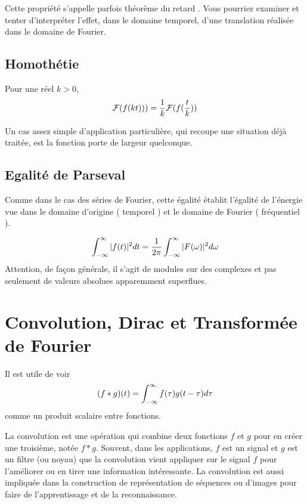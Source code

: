 Cette propriété s'appelle parfois { théorème du retard }.  Vous
pourriez examiner et tenter d'interpréter l'effet, dans le domaine
temporel, d'une translation réalisée dans le domaine de Fourier.

\subsection{Homothétie}
Pour une réel $k>0$,
\begin{equation}
 {\cal F}(f(kt)))=\frac{1}{k}{\cal F}(f(\frac{t}{k}))
\end{equation}

Un cas assez simple d'application particulière, qui recoupe une situation déjà traitée, est la fonction porte de largeur quelconque.

\subsection{Egalité de Parseval}

Comme dans le cas des séries de Fourier, cette égalité établit l'égalité de l'énergie vue dans le domaine d'origine ({ temporel }) et le domaine de Fourier ({ fréquentiel }).

\begin{equation}
  \label{eq:parseval2}
  \int_{-\infty}^{\infty} |f(t)|^2dt=\frac{1}{2\pi}\int_{-\infty}^{\infty}|F(\omega)|^2d\omega
\end{equation}
Attention, de façon générale, il s'agit de modules sur des complexes et pas seulement de valeurs absolues apparemment superflues.

\section{Convolution, Dirac et Transformée de Fourier}

Il est utile de voir 
\begin{equation}
(f*g)(t)=\int_{-\infty}^{\infty} f(\tau)g(t-\tau)d\tau
\end{equation}
comme un produit scalaire entre fonctions.

La convolution est une opération qui combine deux fonctions $f$ et $g$ pour en créer une troisième, notée $f*g$. Souvent, dans les applications, $f$ est un signal et $g$ est un filtre (ou noyau)  que la convolution vient appliquer sur le signal $f$ pour l'améliorer ou en tirer une information intéressante. La convolution est aussi impliquée dans la construction de représentation de séquences ou d'images pour faire de l'apprentissage et de la reconnaissance.

